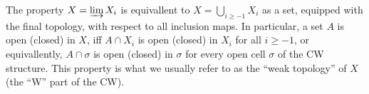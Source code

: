 \begin{remarks}
\begin{i_enum}
\item The property $X=\varinjlim X_i$ is equivallent to $X=\bigcup_{i\geq-1}X_i$ as a set, equipped with the final topology, with respect to all inclusion maps. In particular, a set $A$ is open (closed) in $X$, iff $A\cap X_i$ is open (closed) in $X_i$ for all $i\geq-1$, or equivallently, $A\cap\sigma$ is open (closed) in $\sigma$ for every open cell $\sigma$ of the CW structure. This property is what we usually refer to as the ``weak topology'' of $X$ (the ``W'' part of the CW).
\item 
\end{i_enum}
\end{remarks}





%
%




